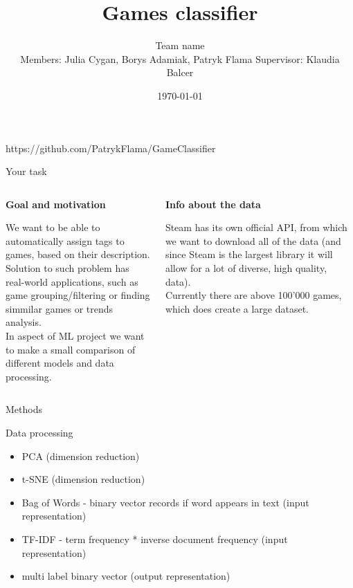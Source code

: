\documentclass{beamer}
\title{Games classifier}
\author[Team name]{Team name\\[5mm]
{\small Members: Julia Cygan, Borys Adamiak, Patryk Flama}
\hspace{18mm} 
{\small Supervisor: Klaudia Balcer}}
\institute{UWr}
\date{\today}
\begin{document}
\begin{frame}
\titlepage
\end{frame}


\begin{frame}
    https://github.com/PatrykFlama/GameClassifier
\end{frame}


\begin{frame}[t]{Your task}

\begin{columns}
\begin{column}[t]{0.5\textwidth}

{\bf Goal and motivation}

We want to be able to automatically assign tags to games, based on their description. \\
Solution to such problem has real-world applications, such as game grouping/filtering or finding simmilar games or trends analysis. \\
In aspect of ML project we want to make a small comparison of different models and data processing.

\end{column}

\pause

\begin{column}[t]{0.5\textwidth}

{\bf Info about the data}

Steam has its own official API, from which we want to download all of the data (and since Steam is the largest library it will allow for a lot of diverse, high quality, data). \\
Currently there are above 100'000 games, which does create a large dataset.

\end{column}
\end{columns}

\end{frame}


\begin{frame}[t]{Methods}

Data processing

\begin{itemize}
\item PCA (dimension reduction)
\item t-SNE (dimension reduction)
\item Bag of Words - binary vector records if word appears in text (input representation)
\item TF-IDF - term frequency * inverse document frequency (input representation)
\item multi label binary vector (output representation)
\end{itemize}
\end{frame}
\end{document}
